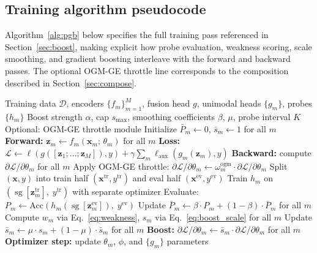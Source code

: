 \documentclass{article}
\newcommand{\loss}{\mathcal{L}}
\newcommand{\encoder}{f}
\newcommand{\probe}{h}
\newcommand{\sg}{\operatorname{sg}}
\begin{document}
\subsection{Training algorithm pseudocode}
\label{app:algorithm}

Algorithm~\ref{alg:pgb} below specifies the full training pass referenced in Section~\ref{sec:boost}, making explicit how probe evaluation, weakness scoring, scale smoothing, and gradient boosting interleave with the forward and backward passes. The optional OGM-GE throttle line corresponds to the composition described in Section~\ref{sec:compose}.

\begin{algorithm}[H]
\caption{Probe-Guided Gradient Boosting (full training pass over $\mathcal{D}$). Notation: $P_m$ per-batch probe accuracy with smoothed estimate $\bar{P}_m$; $\phi$ fusion-head parameters; $\sg[\cdot]$ stop-gradient operator (\S\ref{sec:probes}). Auxiliary-loss weight $\gamma$ and optional OGM-GE throttle $\omega_m^{\text{ogm}} \leq 1$ are introduced in \S\ref{sec:compose}.}
\label{alg:pgb}
\begin{algorithmic}[1]
\REQUIRE Training data $\mathcal{D}$, encoders $\{\encoder_m\}_{m=1}^M$, fusion head $g$, unimodal heads $\{g_m\}$, probes $\{\probe_m\}$
\REQUIRE Boost strength $\alpha$, cap $s_{\max}$, smoothing coefficients $\beta$, $\mu$, probe interval $K$
\REQUIRE Optional: OGM-GE throttle module
\STATE Initialize $\bar{P}_m \leftarrow 0$, $\bar{s}_m \leftarrow 1$ for all $m$
    \STATE \textbf{Forward:} $\mathbf{z}_m \leftarrow \encoder_m(\mathbf{x}_m;\,\theta_m)$ for all $m$
    \STATE \textbf{Loss:} $\loss \leftarrow \ell(g([\mathbf{z}_1;\ldots;\mathbf{z}_M]), y) + \gamma \sum_m \ell_{\text{aux}}(g_m(\mathbf{z}_m), y)$
    \STATE \textbf{Backward:} compute $\partial\loss/\partial\theta_m$ for all $m$
        \STATE Apply OGM-GE throttle: $\partial\loss/\partial\theta_m \leftarrow \omega_m^{\text{ogm}} \cdot \partial\loss/\partial\theta_m$
    \ENDIF
        \STATE Split $(\mathbf{x}, y)$ into train half $(\mathbf{x}^{\text{tr}}, y^{\text{tr}})$ and eval half $(\mathbf{x}^{\text{ev}}, y^{\text{ev}})$
            \STATE Train $\probe_m$ on $(\sg[\mathbf{z}_m^{\text{tr}}],\; y^{\text{tr}})$ with separate optimizer
            \STATE Evaluate: $P_m \leftarrow \text{Acc}(\probe_m(\sg[\mathbf{z}_m^{\text{ev}}]),\; y^{\text{ev}})$
        \ENDFOR
        \STATE Update $\bar{P}_m \leftarrow \beta \cdot P_m + (1-\beta) \cdot \bar{P}_m$ for all $m$
        \STATE Compute $w_m$ via Eq.~\eqref{eq:weakness}, $s_m$ via Eq.~\eqref{eq:boost_scale} for all $m$
        \STATE Update $\bar{s}_m \leftarrow \mu \cdot s_m + (1-\mu) \cdot \bar{s}_m$ for all $m$
    \ENDIF
    \STATE \textbf{Boost:} $\partial\loss/\partial\theta_m \leftarrow \bar{s}_m \cdot \partial\loss/\partial\theta_m$ for all $m$
    \STATE \textbf{Optimizer step:} update $\theta_m$, $\phi$, and $\{g_m\}$ parameters
\ENDFOR
\end{algorithmic}
\end{algorithm}
\end{document}
